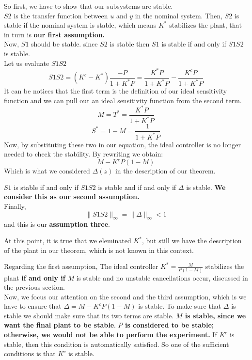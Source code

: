 So first, we have to show that our subsystems are stable.\\

$S2$ is the transfer function between $u$ and $y$ in the nominal system. Then, $S2$ is stable if the nominal system is stable, which means $K^{*}$ stabilizes the plant, that in turn is \textbf{our first assumption.}\\

Now, $S1$ should be stable. since $S2$ is stable then $S1$ is stable if and only if $S1S2$ is stable.\\


Let us evaluate $S1S2$
\[
S1S2 = (K^{c} - K^{*})\frac{-P}{1+K^{*}P} = \frac{K^{*}P}{1+K^{*}P} - \frac{K^{c}P}{1+K^{*}P} 
\]
It can be notices that the first term is the definition of our ideal sensitivity function and we can pull out an ideal sensitivity function from the second term.
\[
M = T^{*} = \frac{K^{*}P}{1+K^{*}P}
\]
\[
S^{*} = 1 - M = \frac{1}{1+ K^{*}P}
\]
Now, by substituting these two in our equation, the ideal controller is no longer needed to check the stability. By rewriting we obtain:
\[
M - K^{c}P(1-M)
\]
Which is what we considered $\Delta(z)$ in the description of our theorem.

$S1$ is stable if and only if $S1S2$ is stable and if and only if $\Delta$ is stable. \textbf{We consider this as our second assumption.}\\

Finally, 
\[
\|S1S2\|_\infty = \|\Delta\|_\infty < 1
\]
and this is our \textbf{assumption three}.

At this point, it is true that we eleminated $K^{*}$, but still we have the description of the plant in our theorem, which is not known in this context.


Regarding the first assumption, The ideal controller $K^{*} = \frac{M}{P(1-M)}$ stabilizes the plant \textbf{if and only if} $M$ is stable and no unstable cancellations occur, discussed in the previous section.\\
Now, we focus our attention on the second and the third assumption, which is we have to ensure that $\Delta = M - K^{c}P(1-M)$ is stable. To make sure that $\Delta$ is stable we should make sure that its two terms are stable. \textbf{$M$ is stable, since we want the final plant to be stable}. \textbf{$P$ is considered to be stable; otherwise, we would not be able to perform the experiment.} If $K^{c}$ is stable, then this condition is automatically satisfied. So one of the sufficient conditions is that $K^{c}$ is stable.\\


